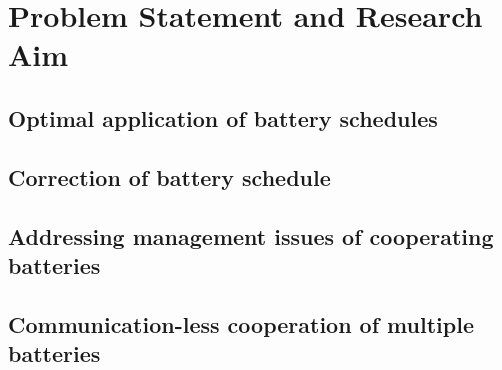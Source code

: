 \section{Problem Statement and Research Aim}
\label{ch-introduction:sec:problem-statement}

\subsection{Optimal application of battery schedules}

\subsection{Correction of battery schedule}

\subsection{Addressing management issues of cooperating batteries}

\subsection{Communication-less cooperation of multiple batteries}